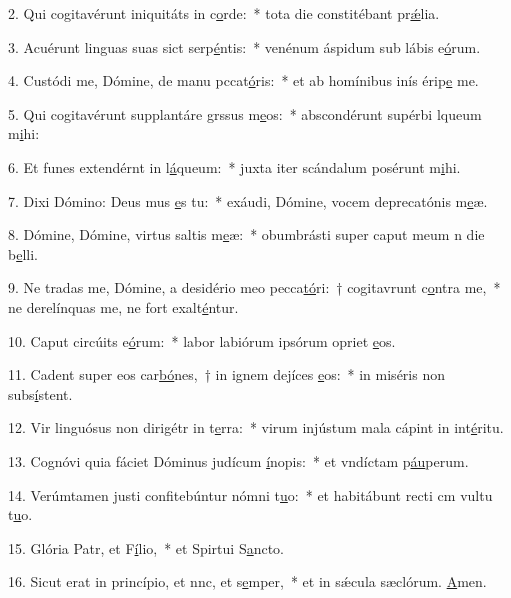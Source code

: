 2. Qui cogitavérunt iniquitáts in c\uline{o}rde:~* tota die constitébant pr\uline{ǽ}lia.\par 
3. Acuérunt linguas suas sict serp\uline{é}ntis:~* venénum áspidum sub lábis e\uline{ó}rum.\par 
4. Custódi me, Dómine, de manu pccat\uline{ó}ris:~* et ab homínibus inís érip\uline{e} me.\par 
5. Qui cogitavérunt supplantáre grssus m\uline{e}os:~* abscondérunt supérbi lqueum m\uline{i}hi:\par 
6. Et funes extendérnt in l\uline{á}queum:~* juxta iter scándalum posérunt m\uline{i}hi.\par 
7. Dixi Dómino: Deus mus \uline{e}s tu:~* exáudi, Dómine, vocem deprecatónis m\uline{e}æ.\par 
8. Dómine, Dómine, virtus saltis m\uline{e}æ:~* obumbrásti super caput meum n die b\uline{e}lli.\par 
9. Ne tradas me, Dómine, a desidério meo pecca\uline{tó}ri:~† cogitavrunt c\uline{o}ntra me,~* ne derelínquas me, ne fort exalt\uline{é}ntur.\par 
10. Caput circúits e\uline{ó}rum:~* labor labiórum ipsórum opriet \uline{e}os.\par 
11. Cadent super eos car\uline{bó}nes,~† in ignem dejíces \uline{e}os:~* in miséris non subs\uline{í}stent.\par 
12. Vir linguósus non dirigétr in t\uline{e}rra:~* virum injústum mala cápint in int\uline{é}ritu.\par 
13. Cognóvi quia fáciet Dóminus judícum \uline{í}nopis:~* et vndíctam p\uline{áu}perum.\par 
14. Verúmtamen justi confitebúntur nómni t\uline{u}o:~* et habitábunt recti cm vultu t\uline{u}o.\par 
15. Glória Patr, et F\uline{í}lio,~* et Spirtui S\uline{a}ncto.\par 
16. Sicut erat in princípio, et nnc, et s\uline{e}mper,~* et in sǽcula sæclórum. \uline{A}men.\par 
